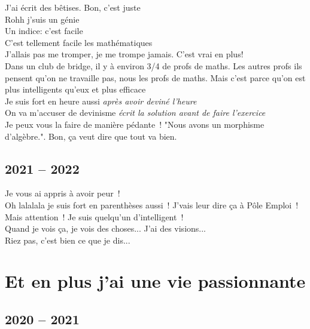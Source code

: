 \documentclass[french, a4paper, openany]{book}
\begin{document}
	\noindent \og J'ai écrit des bêtises. Bon, c'est juste \fg \\
	\og Rohh j'suis un génie \fg \\
	\og Un indice: c'est facile \fg \\
	\og C'est tellement facile les mathématiques \fg \\
	\og J'allais pas me tromper, je me trompe jamais. C'est vrai en plus! \fg \\
	\og Dans un club de bridge, il y à environ 3/4 de profs de maths. Les autres profs ils pensent qu'on ne travaille pas, nous les profs de maths. Mais c'est parce qu'on est plus intelligents qu'eux et plus efficace \fg \\
	\og Je suis fort en heure aussi \fg \emph{après avoir deviné l'heure} \\
	\og On va m'accuser de devinisme \fg \emph{écrit la solution avant de faire l'exercice} \\
	\og Je peux vous la faire de manière pédante~! "Nous avons un morphisme d'algèbre.". Bon, ça veut dire que tout va bien. \fg \\
	
	\subsection*{2021 -- 2022}

	\noindent \og Je vous ai appris à avoir peur~! \fg \\
	\og Oh lalalala je suis fort en parenthèses aussi~! J'vais leur dire ça à Pôle Emploi~! \fg \\
	\og Mais attention~! Je suis quelqu'un d'intelligent~! \fg \\
	\og Quand je vois ça, je vois des choses... J'ai des visions... \fg \\
	\og Riez pas, c'est bien ce que je dis... \fg \\

\section*{Et en plus j'ai une vie passionnante}

	\subsection*{2020 -- 2021}
\end{document}
